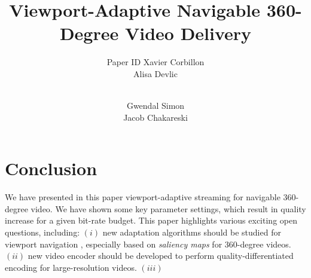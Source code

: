 \documentclass{sig-alternate}
\title{Viewport-Adaptive Navigable 360-Degree Video Delivery}
\author{
\alignauthor
\ifdoubleBlinded
        Paper ID
\else
  Xavier Corbillon\\
  \affaddr{T\'{e}l\'{e}com Bretagne, France}%
\alignauthor
  Alisa Devlic\\
  \affaddr{T\'{e}l\'{e}com Bretagne, France} \\
\and
\alignauthor
  Gwendal Simon\\
  \affaddr{T\'{e}l\'{e}com Bretagne, France}%
\alignauthor
  Jacob Chakareski\\
  \affaddr{Univ. Alabama, USA}
\fi
}
\begin{document}

\maketitle






% 





\section{Conclusion}

We have presented in this paper viewport-adaptive streaming for navigable 360-degree video.
We have shown some key parameter settings, which result in quality increase for a 
given bit-rate budget. This paper highlights various exciting open
questions, including: $(i)$ new adaptation algorithms should be studied for viewport navigation
, especially based on \emph{saliency maps} for 360-degree videos. $(ii)$ new video encoder 
should be 
developed to perform quality-differentiated encoding for large-resolution videos. $(iii)$ 

%
\end{document}
